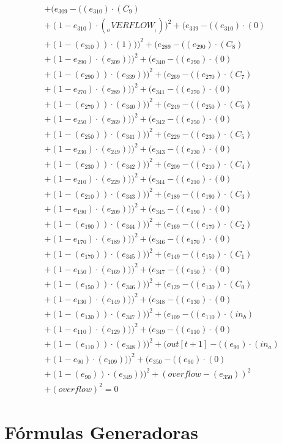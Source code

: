 \documentclass[10pt, a4paper]{article}
\begin{document}
\begin{align*}
& + (e_{309} - ((e_{310})  \cdot  (C_{9}) \\
& + (1 - e_{310})  \cdot  (__OVERFLOW__)))^{2} + (e_{339} - ((e_{310}) \cdot (0) \\
& + (1 - (e_{310})) \cdot (1)))^{2} + (e_{289} - ((e_{290})  \cdot  (C_{8}) \\
& + (1 - e_{290})  \cdot  (e_{309})))^{2} + (e_{340} - ((e_{290}) \cdot (0) \\
& + (1 - (e_{290})) \cdot (e_{339})))^{2} + (e_{269} - ((e_{270})  \cdot  (C_{7}) \\
& + (1 - e_{270})  \cdot  (e_{289})))^{2} + (e_{341} - ((e_{270}) \cdot (0) \\
& + (1 - (e_{270})) \cdot (e_{340})))^{2} + (e_{249} - ((e_{250})  \cdot  (C_{6}) \\
& + (1 - e_{250})  \cdot  (e_{269})))^{2} + (e_{342} - ((e_{250}) \cdot (0) \\
& + (1 - (e_{250})) \cdot (e_{341})))^{2} + (e_{229} - ((e_{230})  \cdot  (C_{5}) \\
& + (1 - e_{230})  \cdot  (e_{249})))^{2} + (e_{343} - ((e_{230}) \cdot (0) \\
& + (1 - (e_{230})) \cdot (e_{342})))^{2} + (e_{209} - ((e_{210})  \cdot  (C_{4}) \\
& + (1 - e_{210})  \cdot  (e_{229})))^{2} + (e_{344} - ((e_{210}) \cdot (0) \\
& + (1 - (e_{210})) \cdot (e_{343})))^{2} + (e_{189} - ((e_{190})  \cdot  (C_{3}) \\
& + (1 - e_{190})  \cdot  (e_{209})))^{2} + (e_{345} - ((e_{190}) \cdot (0) \\
& + (1 - (e_{190})) \cdot (e_{344})))^{2} + (e_{169} - ((e_{170})  \cdot  (C_{2}) \\
& + (1 - e_{170})  \cdot  (e_{189})))^{2} + (e_{346} - ((e_{170}) \cdot (0) \\
& + (1 - (e_{170})) \cdot (e_{345})))^{2} + (e_{149} - ((e_{150})  \cdot  (C_{1}) \\
& + (1 - e_{150})  \cdot  (e_{169})))^{2} + (e_{347} - ((e_{150}) \cdot (0) \\
& + (1 - (e_{150})) \cdot (e_{346})))^{2} + (e_{129} - ((e_{130})  \cdot  (C_{0}) \\
& + (1 - e_{130})  \cdot  (e_{149})))^{2} + (e_{348} - ((e_{130}) \cdot (0) \\
& + (1 - (e_{130})) \cdot (e_{347})))^{2} + (e_{109} - ((e_{110})  \cdot  (in_b) \\
& + (1 - e_{110})  \cdot  (e_{129})))^{2} + (e_{349} - ((e_{110}) \cdot (0) \\
& + (1 - (e_{110})) \cdot (e_{348})))^{2} + (out[t+1] - ((e_{90})  \cdot  (in_a) \\
& + (1 - e_{90})  \cdot  (e_{109})))^{2} + (e_{350} - ((e_{90}) \cdot (0) \\
& + (1 - (e_{90})) \cdot (e_{349})))^{2} + (overflow - (e_{350}))^{2} \\
& + (overflow)^{2} = 0
\end{align*}\part{Fórmulas Generadoras}
\end{document}
